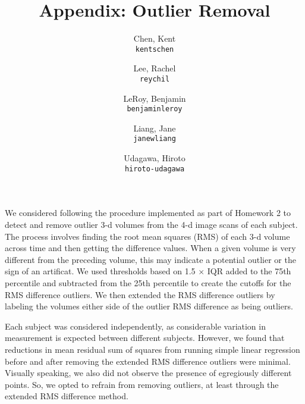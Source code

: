 \documentclass[11pt]{article}
\title{Appendix: Outlier Removal}
\author{
  Chen, Kent\\
  \texttt{kentschen}
  \and
  Lee, Rachel\\
  \texttt{reychil}
  \and
  LeRoy, Benjamin\\
  \texttt{benjaminleroy}
  \and
  Liang, Jane\\
  \texttt{janewliang}
  \and
  Udagawa, Hiroto\\
  \texttt{hiroto-udagawa}
}
\begin{document}
\maketitle

We considered following the procedure implemented as part of Homework 2 to 
detect and remove outlier 3-d volumes from the 4-d image scans of each subject. 
The process involves finding the root mean squares (RMS) of each 3-d volume 
across time and then getting the difference values. When a given volume is very 
different from the preceding volume, this may indicate a potential outlier or 
the sign of an artificat. We used thresholds based on 1.5 $\times$ IQR added to 
the 75th percentile and subtracted from the 25th percentile to create the 
cutoffs for the RMS difference outliers. We then extended the RMS difference 
outliers by labeling the volumes either side of the outlier RMS difference as 
being outliers. 

Each subject was considered independently, as considerable variation in 
measurement is expected between different subjects. However, we found that 
reductions in mean residual sum of squares from running simple linear regression 
before and after removing the extended RMS difference outliers were minimal. 
Visually speaking, we also did not observe the presence of egregiously different 
points. So, we opted to refrain from removing outliers, at least through the 
extended RMS difference method. 


\end{document}
